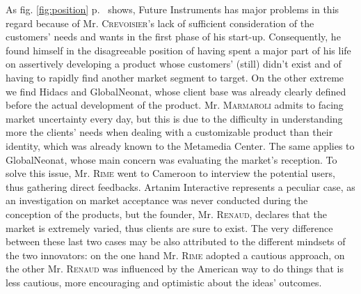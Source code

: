 \documentclass[twoside]{report}
\begin{document}
	As fig. \ref{fig:position} p.~\pageref{fig:position} shows, Future Instruments has major problems in this regard because of Mr. \textsc{Crevoisier}'s lack of sufficient consideration of the customers' needs and wants in the first phase of his start-up. Consequently, he found himself in the disagreeable position of having spent a major part of his life on assertively developing a product whose customers' (still) didn't exist and of having to rapidly find another market segment to target. On the other extreme we find Hidacs and GlobalNeonat, whose client base was already clearly defined before the actual development of the product. Mr. \textsc{Marmaroli} admits to facing market uncertainty every day, but this is due to the difficulty in understanding more the clients' needs when dealing with a customizable product than their identity, which was already known to the Metamedia Center. The same applies to GlobalNeonat, whose main concern was evaluating the market's reception. To solve this issue, Mr. \textsc{Rime} went to Cameroon to interview the potential users, thus gathering direct feedbacks. Artanim Interactive represents a peculiar case, as an investigation on market acceptance was never conducted during the conception of the products, but the founder, Mr. \textsc{Renaud}, declares that the market is extremely varied, thus clients are sure to exist. The very difference between these last two cases may be also attributed to the different mindsets of the two innovators: on the one hand Mr. \textsc{Rime} adopted a cautious approach, on the other Mr. \textsc{Renaud} was influenced by the American way to do things that is less cautious, more encouraging and optimistic about the ideas' outcomes. 
\end{document}
